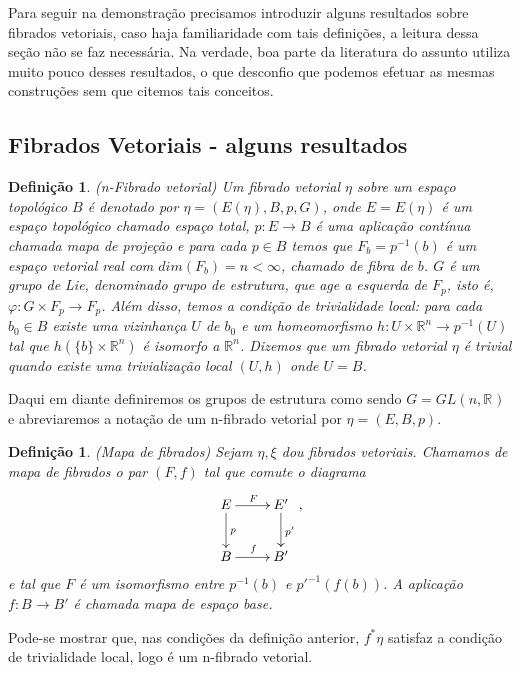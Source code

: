 \documentclass[12pt]{book}
\newtheorem{definicao}[teorema]{Definição}
\newcommand{\real}[1]{\mathbb{R}^{#1}}
\newcommand{\vermelho}[1]{{\color{red}#1}}
\begin{document}
	Para seguir na demonstração precisamos introduzir alguns resultados sobre fibrados vetoriais, caso haja familiaridade com tais definições, a leitura dessa seção não se faz necessária. \vermelho{Na verdade, boa parte da literatura do assunto utiliza muito pouco desses resultados, o que desconfio que podemos efetuar as mesmas construções sem que citemos tais conceitos.}
	\subsection{Fibrados Vetoriais - alguns resultados}
	\begin{definicao}
		(n-Fibrado vetorial) Um fibrado vetorial $\eta$ sobre um espaço topológico $B$ é denotado por $\eta = (E(\eta), B, p, G)$, onde $E=E(\eta)$ é um espaço topológico chamado espaço total, $p:E\to B$ é uma aplicação contínua chamada mapa de projeção e para cada $p \in B$ temos que $F_{b}=p^{-1}(b)$ é um espaço vetorial real com $dim(F_{b}) = n < \infty$, chamado de fibra de $b$. $G$ é um grupo de Lie, denominado grupo de estrutura, que age a esquerda de $F_{p}$, isto é, $\varphi:G\times F_{p} \to F_{p}$. Além disso, temos a condição de trivialidade local: para cada $b_{0} \in B$ existe uma vizinhança $U$ de $b_{0}$ e um homeomorfismo $h:U\times\real{n} \to p^{-1}(U)$ tal que $h(\{b\} \times \real{n})$ é isomorfo a $\real{n}$. Dizemos que um fibrado vetorial $\eta$ é trivial quando existe uma trivialização local $(U, h)$ onde $U = B$.
	\end{definicao}
	
	Daqui em diante definiremos os grupos de estrutura como sendo $G = GL(n,\real{})$ e abreviaremos a notação de um n-fibrado vetorial por $\eta = (E,B,p)$.
	
	\begin{definicao}
		(Mapa de fibrados) Sejam $\eta, \xi$ dou fibrados vetoriais. Chamamos de mapa de fibrados o par $(F, f)$ tal que comute o diagrama
		$$
		\xymatrix{
			E \ar[r]^{F}\ar[d]^{p} & E'\ar[d]^{p'}
			\\
			B\ar[r]^{f} & B'
		},
		$$
		e tal que $F$ é um isomorfismo entre $p^{-1}(b)$ e $p'^{-1}(f(b))$. A aplicação $f:B\to B'$ é chamada mapa de espaço base.
	\end{definicao}
	
	Pode-se mostrar que, nas condições da definição anterior, $f^{*}\eta$ satisfaz a condição de trivialidade local, logo é um n-fibrado vetorial.
	
\end{document}
